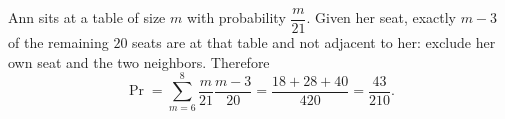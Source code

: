 Ann sits at a table of size $m$ with probability $\dfrac{m}{21}$. Given her seat, exactly $m-3$ of the remaining $20$ seats are at that table and not adjacent to her: exclude her own seat and the two neighbors. Therefore
\[
\boxed{\Pr=\sum_{m=6}^8\dfrac{m}{21}\dfrac{m-3}{20}
=\dfrac{18+28+40}{420}=\dfrac{43}{210}}.
\]
